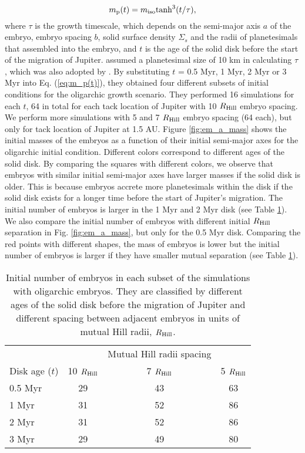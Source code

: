 \documentclass{aa}
\begin{document}
\begin{equation}
m_{\rm p}(t) = m_{\rm iso}{\rm tanh^3} (t/\tau),
\label{eq:m_p(t)}  
\end{equation}
where $\tau$ is the growth timescale, which depends on the semi-major axis $a$ of the embryo, embryo spacing $b$, solid surface density $\Sigma_s$ and the radii of planetesimals that assembled into the embryo, and $t$ is the age of the solid disk before the start of the migration of Jupiter. \cite{chambers2006semi} assumed a planetesimal size of 10 km in calculating $\tau$ , which was also adopted by \cite{brasser2016analysis}. By substituting $t$ = 0.5 Myr, 1 Myr, 2 Myr or 3 Myr into Eq. (\ref{eq:m_p(t)}), they obtained four different subsets of initial conditions for the oligarchic growth scenario. They performed 16 simulations for each $t$, 64 in total for each tack location of Jupiter with 10 $R_{\rm Hill}$ embryo spacing. We perform more simulations with 5 and 7 $R_{\rm Hill}$ embryo spacing (64 each), but only for tack location of Jupiter at 1.5 AU. Figure \ref{fig:em_a_mass} shows the initial masses of the embryos as a function of their initial semi-major axes for the oligarchic initial condition. Different colors correspond to different ages of the solid disk. By comparing the squares with different colors, we observe that embryos with similar initial semi-major axes have larger masses if the solid disk is older. This is because embryos accrete more planetesimals within the disk if the solid disk exists for a longer time before the start of Jupiter’s migration. The initial number of embryos is larger in the 1 Myr and 2 Myr disk (see Table \ref{tb:embryo_no_2}). We also compare the initial number of embryos with different initial $R_{\rm Hill}$ separation in Fig. \ref{fig:em_a_mass}, but only for the 0.5 Myr disk. Comparing the red points with different shapes, the mass of embryos is lower but the initial number of embryos is larger if they have smaller mutual separation (see Table \ref{tb:embryo_no_2}).

\begin{table*}
\caption{Initial number of embryos in each subset of the simulations with oligarchic embryos. They are classified by different ages of the solid disk before the migration of Jupiter and different spacing between adjacent embryos in units of mutual Hill radii, $R_{\rm Hill}$.} 
\label{tb:embryo_no_2}
\centering
\begin{tabular}{lccc}
\hline\hline
 &  & Mutual Hill radii spacing & \\
Disk age ($t$) & 10 $R_{\rm Hill}$ & 7 $R_{\rm Hill}$ & 5 $R_{\rm Hill}$\\
\hline
0.5 Myr & 29 & 43  & 63 \\
1 Myr   & 31 & 52  & 86 \\
2 Myr   & 31 & 52  & 86 \\
3 Myr   & 29 & 49  & 80 \\
\hline
\end{tabular}
\end{table*} 
\end{document}
